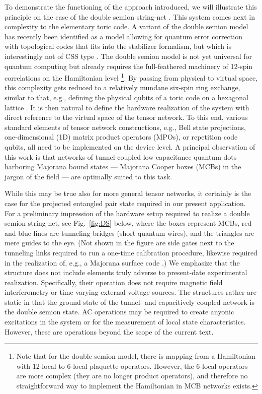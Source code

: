 \documentclass[twocolumn,floats,prx,showpacs]{revtex4-1}
\begin{document}
To demonstrate the functioning of the approach introduced, we will illustrate this principle on the case of the double semion string-net \cite{Levin2005}. This system comes next in complexity to the elementary toric code. A variant of the double semion model 
has recently been identified as a model allowing for quantum error correction
with topological codes that fits into the stabilizer formalism, but which is interestingly not of CSS type
\cite{SemionErrorCorrection}. 
The double semion model  is not yet universal for quantum computing  but already requires the full-feathered machinery of 12-spin correlations on the Hamiltonian level \footnote{Note that for the double semion model, there is mapping from a Hamiltonian with 12-local to 6-local plaquette operators. However, the 6-local operators are more complex (they are no longer  product operators), and therefore no straightforward way to implement the Hamiltonian in  MCB networks exists.}.  By passing from physical to virtual space, this complexity gets reduced to a relatively mundane six-spin ring exchange, similar to that, e.g.,   defining the physical qubits of a toric code on a hexagonal lattice \cite{Vijay2015}.  It is then natural to define the hardware realization of the system with direct reference to the virtual space of the tensor network. To this end, various standard elements of tensor network constructions, e.g.,  Bell state projections, one-dimensional (1D) matrix product operators (MPOs), or repetition code qubits, all need to be implemented on the device level. A principal observation of this work is that networks of tunnel-coupled low capacitance quantum dots harboring Majorana bound states  --- Majorana Cooper boxes (MCBs) in the jargon of the field \cite{Beri2012,Beri2013,Altland2013,Plugge2017,Karzig2017} --- are optimally suited to this task. 

While this may be true also for more general tensor networks, it certainly is the case for the projected entangled pair state required in our present application.  For a preliminary impression of the hardware setup required to realize a double semion string-net, see Fig.~\ref{fig:DS} below, where the boxes represent MCBs, red and blue lines are tunneling bridges (short quantum wires), and the triangles are mere guides to the eye. (Not shown in the figure are side gates next to the tunneling links required to run a one-time calibration procedure, likewise required in the realization of, e.g., a Majorana surface code 
\cite{PhysRevLett.116.050501,PhysRevB.94.174514,PhysRevLett.108.260504,PhysRevX.6.031016,Hoffman16,Roy2017}.) We emphasize that the structure does not include elements truly adverse to present-date experimental realization. Specifically, their operation does not require magnetic field interferometry or time varying external voltage sources. The structures rather are static in that the ground state of the tunnel- and capacitively coupled network is the double semion state. AC operations may be required to create anyonic excitations in the system or for the measurement of local state characteristics. However, these are operations beyond the scope of the current text. 
\end{document}
